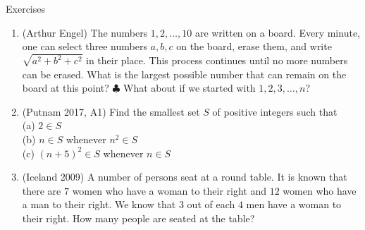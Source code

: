 \begin{xcb}{Exercises}
\begin{enumerate}
\begin{hint}
\end{hint}
\item (Arthur Engel)  The numbers $1, 2, \ldots, 10$ are written on a board. Every minute, one can select three numbers $a, b, c$ on the board, erase them, and write $\sqrt{a^2+b^2+c^2}$ in their place. This process continues until no more numbers can be erased. What is the largest possible number that can remain on the board at this point? $\clubsuit$ What about if we started with $1, 2, 3, \ldots, n$?
\begin{hint}
\end{hint}
\item (Putnam 2017, A1) Find the smallest set $S$ of positive integers such that \\
(a) $2 \in S$ \\
(b) $n \in S$ whenever $n^2 \in S$ \\
(c) $(n + 5)^2 \in S$ whenever $n \in S$ \\
\begin{hint}
\end{hint}
\item  (Iceland 2009)  A number of persons seat at a round table. It is known that there are $7$ women who have a woman to their right and $12$ women who have a man to their right. We know that $3$ out of each $4$ men have a woman to their right. How many people are seated at the table?
\begin{hint}
\end{hint}
\end{enumerate}
\end{xcb}
